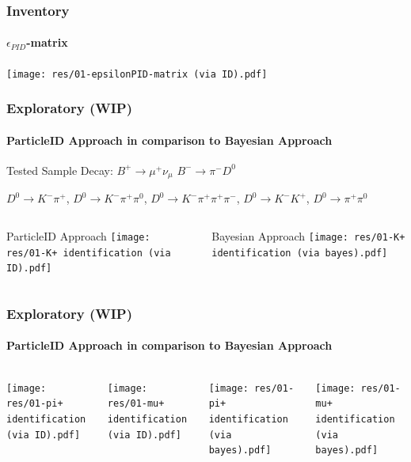 \documentclass{beamer}
\begin{document}
\begin{frame}
	\frametitle{Inventory}
	\framesubtitle{$\epsilon_{PID}$-matrix}

	\centering
	\texttt{[image: res/01-epsilonPID-matrix (via ID).pdf]}
\end{frame}

\begin{frame}
	\frametitle{Exploratory (WIP)}
	\framesubtitle{ParticleID Approach in comparison to Bayesian Approach}

	Tested Sample Decay: \hspace{2em}
	$B^+ \rightarrow \mu^+ \nu_{\mu}$
	\hspace{2em}
	$B^- \rightarrow \pi^- D^0$
	\\
	\begin{addmargin}[1em]{0em}
		$D^0 \rightarrow K^- \pi^+$,
		$D^0 \rightarrow K^- \pi^+ \pi^0$,
		$D^0 \rightarrow K^- \pi^+ \pi^+ \pi^-$,
		$D^0 \rightarrow K^- K^+$,
		$D^0 \rightarrow \pi^+ \pi^0$
	\end{addmargin}

	\vspace{1em}

	\begin{columns}[T]
		\begin{column}{.5\textwidth}
			\centering ParticleID Approach
			\texttt{[image: res/01-K+ identification (via ID).pdf]}
		\end{column}
		\begin{column}{.5\textwidth}
			\centering Bayesian Approach
			\texttt{[image: res/01-K+ identification (via bayes).pdf]}
		\end{column}
	\end{columns}
\end{frame}

\begin{frame}
	\frametitle{Exploratory (WIP)}
	\framesubtitle{ParticleID Approach in comparison to Bayesian Approach}

	\begin{columns}
		\begin{minipage}[c][0.4\textheight][c]{\linewidth}
			\centering
			\texttt{[image: res/01-pi+ identification (via ID).pdf]}
		\end{minipage}
		\begin{minipage}[c][0.4\textheight][c]{\linewidth}
			\centering
			\texttt{[image: res/01-mu+ identification (via ID).pdf]}
		\end{minipage}

		\begin{minipage}[c][0.4\textheight][c]{\linewidth}
			\centering
			\texttt{[image: res/01-pi+ identification (via bayes).pdf]}
		\end{minipage}
		\begin{minipage}[c][0.4\textheight][c]{\linewidth}
			\centering
			\texttt{[image: res/01-mu+ identification (via bayes).pdf]}
		\end{minipage}
	\end{columns}
\end{frame}
\end{document}

